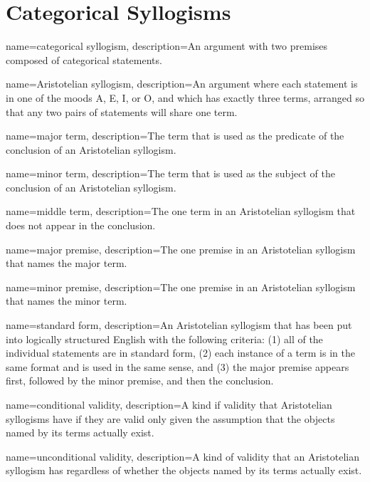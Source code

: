 \chapter{Categorical Syllogisms}\label{ch:catsyllogisms}

{
name=categorical syllogism,
description={An argument with two premises composed of categorical statements.}
}

{
name=Aristotelian syllogism,
description={An argument where each statement is in one of the moods A, E, I, or O, and which has exactly three terms, arranged so that any two pairs of statements will share one term.}
}

{
name=major term,
description={The term that is used as the predicate of the conclusion of an Aristotelian syllogism.}
}

{
name=minor term,
description={The term that is used as the subject of the conclusion of an Aristotelian syllogism.}
}

{
name=middle term,
description={The one term in an Aristotelian syllogism that does not appear in the conclusion.}
}

{
name=major premise,
description={The one premise in an Aristotelian syllogism that names the major term.}
}

{
name=minor premise,
description={The one premise in an Aristotelian syllogism that names the minor term.}
}

{
name=standard form,
description={An Aristotelian syllogism that has been put into logically structured English with the following criteria: (1) all of the individual statements are in standard form, (2) each instance of a term is in the same format and is used in the same sense, and (3) the major premise appears first, followed by the minor premise, and then the conclusion.}
}

{
name=conditional validity,
description={A kind if validity that Aristotelian syllogisms have if they are valid only given the assumption that the objects named by its terms actually exist.}
}

{
name=unconditional validity,
description={A kind of validity that an Aristotelian syllogism has regardless of whether the objects named by its terms actually exist.}
}

